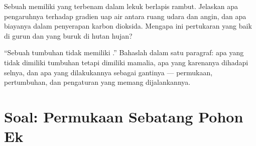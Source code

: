 \begin{exercise}[$\star\star\star$]\label{exo:b1:flowering-plant-organization:11}
Sebuah  memiliki  yang terbenam dalam lekuk berlapis
rambut. Jelaskan apa pengaruhnya terhadap gradien uap air antara ruang
udara  dan angin, dan apa biayanya dalam penyerapan karbon
dioksida. Mengapa ini pertukaran yang baik di gurun dan yang buruk di
hutan hujan?
\end{exercise}

\begin{exercise}[$\star\star\star$]\label{exo:b1:flowering-plant-organization:12}
``Sebuah tumbuhan tidak memiliki .'' Bahaslah dalam
satu paragraf: apa yang tidak dimiliki tumbuhan tetapi dimiliki
mamalia, apa yang karenanya dihadapi selnya, dan apa yang dilakukannya
sebagai gantinya --- permukaan, pertumbuhan, dan pengaturan yang memang
dijalankannya.
\end{exercise}

\section{Soal: Permukaan Sebatang Pohon Ek}

